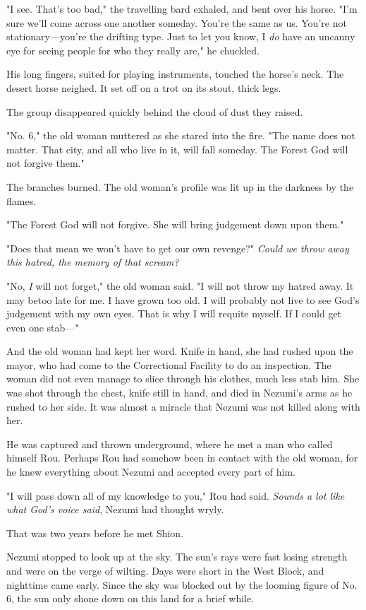 "I see. That's too bad," the travelling bard exhaled, and bent over his
horse. "I'm sure we'll come across one another someday. You're the same
as us. You're not stationary---you're the drifting type. Just to let you
know, I \emph{do} have an uncanny eye for seeing people for who they really
are," he chuckled.

His long fingers, suited for playing instruments, touched the horse's
neck. The desert horse neighed. It set off on a trot on its stout, thick
legs.

The group disappeared quickly behind the cloud of dust they raised.

"No. 6," the old woman muttered as she stared into the fire. "The name
does not matter. That city, and all who live in it, will fall someday.
The Forest God will not forgive them."

The branches burned. The old woman's profile was lit up in the darkness
by the flames.

"The Forest God will not forgive. She will bring judgement down upon
them."

"Does that mean we won't have to get our own revenge?" \emph{Could we throw
away this hatred, the memory of that scream?}

"No, \emph{I} will not forget," the old woman said. "I will not throw my hatred
away. It may be\el too late for me. I have grown too old. I will
probably not live to see God's judgement with my own eyes. That is why I
will requite myself. If I could get even one stab---"

And the old woman had kept her word. Knife in hand, she had rushed upon
the mayor, who had come to the Correctional Facility to do an
inspection. The woman did not even manage to slice through his clothes,
much less stab him. She was shot through the chest, knife still in hand,
and died in Nezumi's arms as he rushed to her side. It was almost a
miracle that Nezumi was not killed along with her.

He was captured and thrown underground, where he met a man who called
himself Rou. Perhaps Rou had somehow been in contact with the old woman,
for he knew everything about Nezumi and accepted every part of him.

"I will pass down all of my knowledge to you," Rou had said. \emph{Sounds a
lot like what God's voice said}, Nezumi had thought wryly.

That was two years before he met Shion.

\mybreak

Nezumi stopped to look up at the sky. The sun's rays were fast losing
strength and were on the verge of wilting. Days were short in the West
Block, and nighttime came early. Since the sky was blocked out by the
looming figure of No. 6, the sun only shone down on this land for a
brief while.

